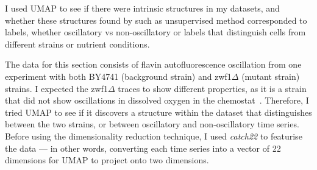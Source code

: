 I used UMAP to see if there were intrinsic structures in my datasets, and whether these structures found by such as unsupervised method corresponded to labels, whether oscillatory vs non-oscillatory or labels that distinguish cells from different strains or nutrient conditions.

The data for this section consists of flavin autofluorescence oscillation from one experiment with both BY4741 (background strain) and zwf1$\Delta$ (mutant strain) strains.
I expected the zwf1$\Delta$ traces to show different properties, as it is a strain that did not show oscillations in dissolved oxygen in the chemostat~\parencite{tuCyclicChangesMetabolic2007}.
Therefore, I tried UMAP to see if it discovers a structure within the dataset that distinguishes between the two strains, or between oscillatory and non-oscillatory time series.
Before using the dimensionality reduction technique, I used \textit{catch22} to featurise the data --- in other words, converting each time series into a vector of 22 dimensions for UMAP to project onto two dimensions.

